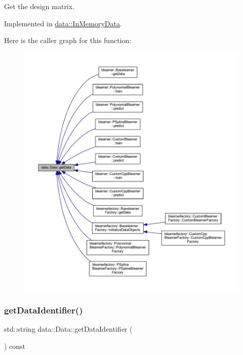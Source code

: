 Get the design matrix. 



Implemented in \mbox{\hyperlink{classdata_1_1_in_memory_data_ac0993c38a9633fa0f1ff787660b86c71}{data\+::\+In\+Memory\+Data}}.

Here is the caller graph for this function\+:\nopagebreak
\begin{figure}[H]
\begin{center}
\leavevmode
\includegraphics[width=350pt]{classdata_1_1_data_aa4073af1bc8ccc7c50809e1676436eb4_icgraph}
\end{center}
\end{figure}
\mbox{\label{classdata_1_1_data_a1af63a4e5aa708de31e1ffdd727a4e16}} 
\subsubsection{\texorpdfstring{get\+Data\+Identifier()}{getDataIdentifier()}}
{\footnotesize\ttfamily std\+::string data\+::\+Data\+::get\+Data\+Identifier (\begin{DoxyParamCaption}{ }\end{DoxyParamCaption}) const}

